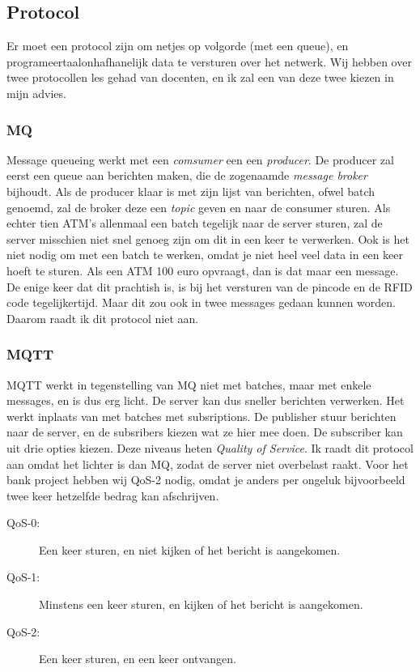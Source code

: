 \documentclass{article}
\begin{document}
\newpage

\subsection{Protocol}

Er moet een protocol zijn om netjes op volgorde (met een queue), en programeertaalonhafhanelijk data te versturen over het netwerk.
Wij hebben over twee protocollen les gehad van docenten, en ik zal een van deze twee kiezen in mijn advies.

\subsubsection{MQ}

Message queueing werkt met een \emph{comsumer} een een \emph{producer}.
De producer zal eerst een queue aan berichten maken, die de zogenaamde \emph{message broker} bijhoudt.
Als de producer klaar is met zijn lijst van berichten, ofwel batch genoemd, zal de broker deze een \emph{topic} geven en naar de consumer sturen.
Als echter tien ATM's allenmaal een batch tegelijk naar de server sturen, zal de server misschien niet snel genoeg zijn om dit in een keer te verwerken.
Ook is het niet nodig om met een batch te werken, omdat je niet heel veel data in een keer hoeft te sturen.
Als een ATM 100 euro opvraagt, dan is dat maar een message.
De enige keer dat dit prachtish is, is bij het versturen van de pincode en de RFID code tegelijkertijd.
Maar dit zou ook in twee messages gedaan kunnen worden.
Daarom raadt ik dit protocol niet aan.

\subsubsection{MQTT}

MQTT werkt in tegenstelling van MQ niet met batches, maar met enkele messages, en is dus erg licht.
De server kan dus sneller berichten verwerken.
Het werkt inplaats van met batches met subsriptions.
De publisher stuur berichten naar de server, en de subsribers kiezen wat ze hier mee doen.
De subscriber kan uit drie opties kiezen.
Deze niveaus heten \emph{Quality of Service}.
Ik raadt dit protocol aan omdat het lichter is dan MQ, zodat de server niet overbelast raakt.
Voor het bank project hebben wij QoS-2 nodig, omdat je anders per ongeluk bijvoorbeeld twee keer hetzelfde bedrag kan afschrijven.

\begin{description}
\item [QoS-0:] Een keer sturen, en niet kijken of het bericht is aangekomen.
\item [QoS-1:] Minstens een keer sturen, en kijken of het bericht is aangekomen.
\item [QoS-2:] Een keer sturen, en een keer ontvangen.
\end{description}
\end{document}
